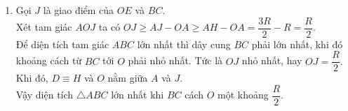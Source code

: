 \begin{bt}
{\begin{enumerate}
\begin{enumerate}[1)]
				Do $A$ cố định, $R$ không đổi nên $BC$ luôn tiếp xúc với đường tròn $\left(A, \dfrac{3R}{2}\right)$ cố định.
				\item Gọi $J$ là giao điểm của $OE$ và $BC$.\\
				Xét tam giác $AOJ$ ta có
				$OJ \geq AJ- OA \geq AH- OA= \dfrac{3R}{2}- R= \dfrac{R}{2}.$\\
				Để diện tích tam giác $ABC$ lớn nhất thì dây cung $BC$ phải lớn nhất, khi đó khoảng cách từ $BC$ tới $O$ phải nhỏ nhất. Tức là $OJ$ nhỏ nhất, hay $OJ= \dfrac{R}{2}.$\\
				Khi đó, $D \equiv H$ và $O$ nằm giữa $A$ và $J$.\\
				Vậy diện tích $\triangle ABC$ lớn nhất khi $BC$ cách $O$ một khoảng $\dfrac{R}{2}$.
			\end{enumerate}
		\end{enumerate}
		
	}
\end{bt}
